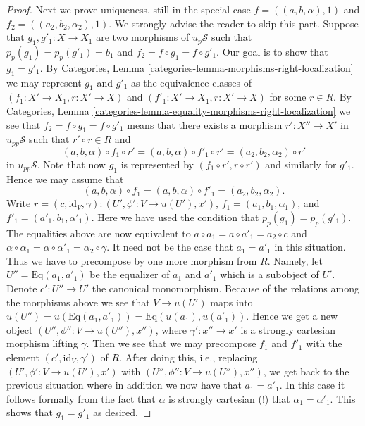 \documentclass{stacks-project}
\theoremstyle{plain}
\theoremstyle{definition}
\theoremstyle{remark}
\numberwithin{equation}{subsection}
\begin{document}
\begin{proof}
\medskip\noindent
Next we prove uniqueness, still in the special case
$f = ((a, b, \alpha), 1)$ and $f_2 = ((a_2, b_2, \alpha_2), 1)$.
We strongly advise the reader to skip this part.
Suppose that $g_1, g'_1 : X \to X_1$ are two morphisms of
$u_p\mathcal{S}$ such that $p_p(g_1) = p_p(g'_1) = b_1$ and
$f_2 = f \circ g_1 = f \circ g'_1$. Our goal is to show that
$g_1 = g'_1$. By
Categories, Lemma \ref{categories-lemma-morphisms-right-localization}
we may represent $g_1$ and $g'_1$ as the equivalence classes of
$(f_1 : X' \to X_1, r : X' \to X)$ and
$(f'_1 : X' \to X_1, r : X' \to X)$ for some $r \in R$. By
Categories, Lemma \ref{categories-lemma-equality-morphisms-right-localization}
we see that $f_2 = f \circ g_1 = f \circ g'_1$ means that there
exists a morphism $r' : X'' \to X'$ in $u_{pp}\mathcal{S}$ such that
$r' \circ r \in R$ and
$$
(a, b, \alpha) \circ f_1 \circ r' =
(a, b, \alpha) \circ f'_1 \circ r' =
(a_2, b_2, \alpha_2) \circ r'
$$
in $u_{pp}\mathcal{S}$. Note that
now $g_1$ is represented by $(f_1 \circ r', r \circ r')$ and
similarly for $g'_1$. Hence we may assume that
$$
(a, b, \alpha) \circ f_1 =
(a, b, \alpha) \circ f'_1 =
(a_2, b_2, \alpha_2).
$$
Write $r = (c, \text{id}_V, \gamma) : (U', \phi' : V \to u(U'), x')$,
$f_1 = (a_1, b_1, \alpha_1)$, and $f'_1 = (a'_1, b_1, \alpha'_1)$.
Here we have used the condition that $p_p(g_1) = p_p(g'_1)$.
The equalities above are now equivalent to
$a \circ a_1 = a \circ a'_1 = a_2 \circ c$ and
$\alpha \circ \alpha_1 = \alpha \circ \alpha'_1 = \alpha_2 \circ \gamma$.
It need not be the case that $a_1 = a'_1$ in this situation.
Thus we have to precompose by one more morphism from $R$.
Namely, let $U'' = \text{Eq}(a_1, a'_1)$ be the equalizer of
$a_1$ and $a'_1$ which is a subobject of $U'$. Denote
$c' : U'' \to U'$ the canonical monomorphism.
Because of the relations among the morphisms
above we see that $V \to u(U')$ maps into
$u(U'') = u(\text{Eq}(a_1, a'_1)) = \text{Eq}(u(a_1), u(a'_1))$.
Hence we get a new object $(U'', \phi'' : V \to u(U''), x'')$, where
$\gamma' : x'' \to x'$ is a strongly cartesian morphism lifting $\gamma$.
Then we see that we may precompose $f_1$ and $f'_1$ with the element
$(c', \text{id}_V, \gamma')$ of $R$. After doing this, i.e., replacing
$(U', \phi' : V \to u(U'), x')$ with
$(U'', \phi'' : V \to u(U''), x'')$, we get back to the previous
situation where in addition we now have that $a_1 = a'_1$.
In this case it follows formally from the fact that $\alpha$
is strongly cartesian (!) that $\alpha_1 = \alpha'_1$.
This shows that $g_1 = g'_1$ as desired.


\end{proof}
\end{document}
